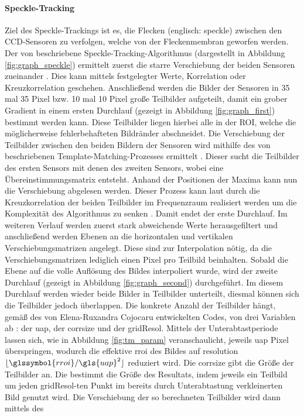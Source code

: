 \paragraph{Speckle-Tracking}
\label{sec:speckle-tracking}
Ziel des Speckle-Trackings ist es, die Flecken (englisch: speckle) zwischen den \gls{CCD}-Sensoren zu verfolgen, welche von der Fleckenmembran geworfen werden. Der von \citeauthor{Ber13} beschriebene Speckle-Tracking-Algorithmus (dargestellt in Abbildung \ref{fig:graph_speckle}) ermittelt zuerst die starre Verschiebung der beiden Sensoren zueinander . Dies kann mittels festgelegter Werte, Korrelation oder Kreuzkorrelation geschehen. Anschließend werden die Bilder der Sensoren in 35 mal 35 Pixel bzw. 10 mal 10 Pixel große Teilbilder aufgeteilt, damit ein grober Gradient in einem ersten Durchlauf (gezeigt in Abbildung \ref{fig:graph_first}) bestimmt werden kann. Diese Teilbilder liegen hierbei alle in der \gls{ROI}, welche die möglicherweise fehlerbehafteten Bildränder abschneidet. Die Verschiebung der Teilbilder zwischen den beiden Bildern der Sensoren wird mithilfe des von \citeauthor{Lew94} beschriebenen Template-Matching-Prozesses ermittelt \cite{Lew94}. Dieser sucht die Teilbilder des ersten Sensors mit denen des zweiten Sensors, wobei eine Übereinstimmungsmatrix entsteht. Anhand der Positionen der Maxima kann nun die Verschiebung abgelesen werden. Dieser Prozess kann laut \citeauthor{Lew94} durch die Kreuzkorrelation der beiden Teilbilder im Frequenzraum realisiert werden um die Komplexität des Algorithmus zu senken \cite{Lew94}. Damit endet der erste Durchlauf. Im weiteren Verlauf werden zuerst stark abweichende Werte herausgefiltert und anschließend werden Ebenen an die horizontalen und vertikalen Verschiebungsmatrizen angelegt. Diese sind zur Interpolation nötig, da die Verschiebungsmatrizen lediglich einen Pixel pro Teilbild beinhalten. Sobald die Ebene auf die volle Auflösung des Bildes interpoliert wurde, wird der zweite Durchlauf (gezeigt in Abbildung \ref{fig:graph_second}) durchgeführt. Im diesem Durchlauf werden wieder beide Bilder in Teilbilder unterteilt, diesmal können sich die Teilbilder jedoch überlappen. Die konkrete Anzahl der Teilbilder hängt, gemäß des von Elena-Ruxandra Cojocaru entwickelten Codes, von drei Variablen ab \cite{Coj17}: der \gls{uap}, der \gls{corrsize} und der \gls{gridResol}. Mittels der Unterabtastperiode lassen sich, wie in Abbildung \ref{fig:tm_param} veranschaulicht, jeweils \gls{uap} Pixel überspringen, wodurch die effektive \gls{rroi} des Bildes auf \glsdesc{resolution} $\lfloor\glssymbol{rroi}/\gls{uap}^2\rfloor$ reduziert wird. Die  \gls{corrsize} gibt die Größe der Teilbilder an. Die  bestimmt die Größe des Resultats, indem jeweils ein Teilbild um jeden \gls{gridResol}-ten Punkt im bereits durch Unterabtastung verkleinerten Bild genutzt wird. Die Verschiebung der so berechneten Teilbilder wird dann mittels des 